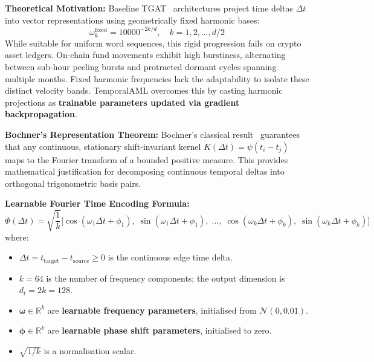 \vspace{0.5em}
\noindent \textbf{Theoretical Motivation:} Baseline TGAT~\cite{xu2020tgat} architectures project time deltas $\Delta t$ into vector representations using geometrically fixed harmonic bases:
\begin{equation}
\omega_k^{\text{fixed}} = 10000^{-2k/d}, \quad k = 1, 2, \ldots, d/2
\label{eq:fixed_freq}
\end{equation}
While suitable for uniform word sequences, this rigid progression fails on crypto asset ledgers. On-chain fund movements exhibit high burstiness, alternating between sub-hour peeling bursts and protracted dormant cycles spanning multiple months. Fixed harmonic frequencies lack the adaptability to isolate these distinct velocity bands. TemporalAML overcomes this by casting harmonic projections as \textbf{trainable parameters updated via gradient backpropagation}.

\vspace{0.5em}
\noindent \textbf{Bochner's Representation Theorem:} Bochner's classical result~\cite{bochner1933monotone} guarantees that any continuous, stationary shift-invariant kernel $K(\Delta t) = \psi(t_i - t_j)$ maps to the Fourier transform of a bounded positive measure. This provides mathematical justification for decomposing continuous temporal deltas into orthogonal trigonometric basis pairs.

\vspace{0.5em}
\noindent \textbf{Learnable Fourier Time Encoding Formula:}
\begin{equation}
\Phi(\Delta t) = \sqrt{\frac{1}{k}} \Big[ \cos(\omega_1 \Delta t + \phi_1), \; \sin(\omega_1 \Delta t + \phi_1), \; \ldots, \; \cos(\omega_k \Delta t + \phi_k), \; \sin(\omega_k \Delta t + \phi_k) \Big]
\label{eq:fourier_encoding}
\end{equation}
where:
\begin{itemize}
	\item $\Delta t = t_{\text{target}} - t_{\text{source}} \geq 0$ is the continuous edge time delta.
	\item $k = 64$ is the number of frequency components; the output dimension is $d_t = 2k = 128$.
	\item $\boldsymbol{\omega} \in \mathbb{R}^{k}$ are \textbf{learnable frequency parameters}, initialised from $\mathcal{N}(0, 0.01)$.
	\item $\boldsymbol{\phi} \in \mathbb{R}^{k}$ are \textbf{learnable phase shift parameters}, initialised to zero.
	\item $\sqrt{1/k}$ is a normalisation scalar.
\end{itemize}

